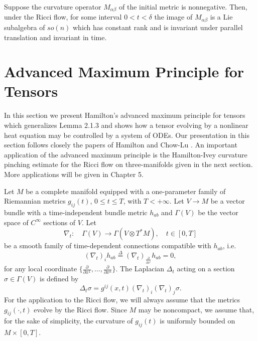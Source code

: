\begin{theorem}
  \label{thm:cz-parallel-invariance-of-the-curvature-operator-image}
Suppose the curvature operator $M_{\alpha\beta}$ of the initial
metric is nonnegative. Then, under the Ricci flow, for some
interval $0<t<\delta$ the image of $M_{\alpha\beta}$ is a Lie
subalgebra of $so(n)$ which has constant rank and is invariant
under parallel translation and invariant in time.
\end{theorem}


\section{Advanced Maximum Principle for Tensors}

In this section we present Hamilton's advanced maximum principle
\cite{Ha86} for tensors which generalizes Lemma 2.1.3 and shows
how a tensor evolving by a nonlinear heat equation may be
controlled by a system of ODEs. Our presentation in this section
follows closely the papers of Hamilton \cite{Ha86} and Chow-Lu
\cite{Cl04}. An important application of the advanced maximum
principle is the Hamilton-Ivey curvature pinching estimate for the
Ricci flow on three-manifolds given in the next section. More
applications will be given in Chapter 5.

Let $M$ be a complete manifold equipped with a one-parameter
family of Riemannian metrics $g_{ij}(t)$, $0\le t\le T$, with
$T<+\infty$. Let $V\rightarrow M$ be a vector bundle with a
time-independent bundle metric $h_{ab}$ and $\Gamma(V)$ be the
vector space of $C^\infty$ sections of $V$. Let
$$
\nabla_t:\quad \Gamma(V)\rightarrow\Gamma(V\otimes T^*M), \quad
t\in[0,T]
$$
be a smooth family of time-dependent connections compatible with
$h_{ab}$, i.e.
$$
(\nabla_t)_ih_{ab}\stackrel{\Delta}{=}
(\nabla_t)_{\frac{\partial}{\partial x^i}}h_{ab}=0,
$$
for any local coordinate $\{\frac{\partial}{\partial
x^1},\ldots,\frac{\partial}{\partial x^n}\}.$ The Laplacian
$\Delta_t$ acting on a section $\sigma\in\Gamma(V)$ is defined by
$$
\Delta_t\sigma=g^{ij}(x,t)(\nabla_t)_i(\nabla_t)_j\sigma.
$$
For the application to the Ricci flow, we will always assume that
the metrics $g_{ij}(\cdot,t)$ evolve by the Ricci flow. Since $M$
may be noncompact, we assume that, for the sake of simplicity, the
curvature of $g_{ij}(t)$ is uniformly bounded on $M\times [0,T]$.


